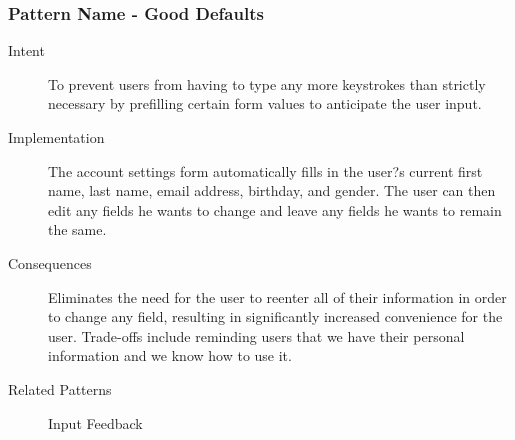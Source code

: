 \subsubsection{Pattern Name - Good Defaults}
\begin{description}
\item[Intent] To prevent users from having to type any more keystrokes than strictly necessary by prefilling certain form values to anticipate the user input.
\item[Implementation] The account settings form automatically fills in the user?s current first name, last name, email address, birthday, and gender. The user can then edit any fields he wants to change and leave any fields he wants to remain the same.
\item[Consequences] Eliminates the need for the user to reenter all of their information in order to change any field, resulting in significantly increased convenience for the user. Trade-offs include reminding users that we have their personal information and we know how to use it.
\item[Related Patterns] Input Feedback
\end{description}

